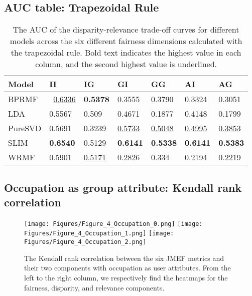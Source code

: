 \subsection{AUC table: Trapezoidal Rule} 
\begin{table}[H]
\centering
\begin{tabular}{lllllll}
\hline
\textbf{Model} & \textbf{II} & \textbf{IG} & \textbf{GI} & \textbf{GG} & \textbf{AI} & \textbf{AG} \\
\hline
BPRMF  &  \ \underline{0.6336} & \textbf{0.5378} & 0.3555 &  0.3790  &  0.3324  & 0.3051  \\ 
LDA  &  0.5567 & 0.509  & 0.4671  &  0.1877  & 0.4148   & 0.1799 \\ 
PureSVD  &  0.5691  &  0.3239  &  \underline{0.5733}  & \underline{0.5048}  & \underline{0.4995}  &  \underline{0.3853}  \\ 
SLIM  &  \textbf{0.6540}  &  0.5129  &  \textbf{0.6141}  &  \textbf{0.5338}  &  \textbf{0.6141}  &  \textbf{0.5383}  \\ 
WRMF  &  0.5901  &  \underline{0.5171}  &  0.2826  &  0.334  &  0.2194  &  0.2219  \\ 
\hline
\end{tabular}
\caption{\label{our_auc}
The AUC of the disparity-relevance trade-off curves for different models across the six different fairness dimensions calculated with the trapezoidal rule. Bold text indicates the highest value in each column, and the second highest value is underlined. 
}
\end{table}

\renewcommand{\thesubsection}{\textbf{\textcolor{black}{C}}}
\subsection{Occupation as group attribute: Kendall rank correlation} \label{occupation_kendall}
\begin{figure}[H]
    \centering
    \texttt{[image: Figures/Figure\_4\_Occupation\_0.png]}
    \texttt{[image: Figures/Figure\_4\_Occupation\_1.png]} 
    \texttt{[image: Figures/Figure\_4\_Occupation\_2.png]}
    \caption{The Kendall rank correlation between the six JMEF metrics and their two components with occupation as user attributes. From the left to the right column, we respectively find the heatmaps for the fairness, disparity, and relevance components.}
    \label{occ_kendall}
\end{figure}


